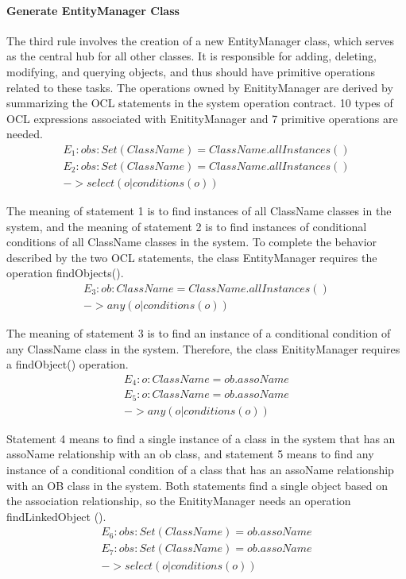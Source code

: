 \documentclass[pdflatex,sn-mathphys-num]{sn-jnl}%
\theoremstyle{thmstyleone}%
\theoremstyle{thmstyletwo}%
\theoremstyle{thmstylethree}%
\begin{document}
\paragraph{Generate EntityManager Class}
The third rule involves the creation of a new EntityManager class, which serves as the central hub for all other classes. It is responsible for adding, deleting, modifying, and querying objects, and thus should have primitive operations related to these tasks.
The operations owned by EnitityManager are derived by summarizing the OCL statements in the system operation contract. 10 types of OCL expressions associated with EnitityManager and 7 primitive operations are needed.
\begin{gather*}
   \textit{$E_1: obs: Set (ClassName) = ClassName.allInstances()$}\\
   \textit{$E_2: obs: Set (ClassName) = ClassName.allInstances()$}\\
   \textit{$-> select (o | conditions(o))$}
\end{gather*}

The meaning of statement 1 is to find instances of all ClassName classes in the system, and the meaning of statement 2 is to find instances of conditional conditions of all ClassName classes in the system. To complete the behavior described by the two OCL statements, the class EntityManager requires the operation findObjects().
\begin{gather*}
    E_3: ob: ClassName = ClassName.allInstances()\\
    -> any (o | conditions(o))
\end{gather*}

The meaning of statement 3 is to find an instance of a conditional condition of any ClassName class in the system. Therefore, the class EnitityManager requires a findObject() operation.
\begin{gather*}
E_4: o: ClassName = ob.assoName\\
E_5: o: ClassName = ob.assoName \\
-> any (o | conditions(o))    
\end{gather*}

Statement 4 means to find a single instance of a class in the system that has an assoName relationship with an ob class, and statement 5 means to find any instance of a conditional condition of a class that has an assoName relationship with an OB class in the system. Both statements find a single object based on the association relationship, so the EnitityManager needs an operation findLinkedObject ().
\begin{gather*}
   E_6: obs: Set (ClassName) = ob.assoName\\
   E_7: obs: Set (ClassName) = ob.assoName\\
   -> select (o | conditions(o)) 
\end{gather*}
\end{document}
